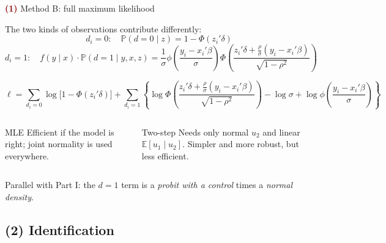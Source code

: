 \documentclass[aspectratio=169,11pt]{beamer}
\newcommand{\E}{\mathbb{E}}
\newcommand{\Pp}{\mathbb{P}}
\newcommand{\Part}[1]{\textcolor{DarkRed}{\textbf{(#1)}}}
\begin{document}
\begin{frame}{\Part{1} Method B: full maximum likelihood}

The two kinds of observations contribute differently:
\[
d_i=0:\quad \Pp(d=0\mid z)=1-\Phi(z_i'\delta)
\]
\[
d_i=1:\quad f(y\mid x)\cdot\Pp(d=1\mid y,x,z)
=\frac1\sigma\phi\!\left(\frac{y_i-x_i'\beta}{\sigma}\right)
\Phi\!\left(\frac{z_i'\delta+\frac{\rho}{\sigma}(y_i-x_i'\beta)}{\sqrt{1-\rho^2}}\right)
\]

\pause

\[
\boxed{
\ell=\sum_{d_i=0}\log\big[1-\Phi(z_i'\delta)\big]
+\sum_{d_i=1}\left\{
\log\Phi\!\left(\frac{z_i'\delta+\frac{\rho}{\sigma}(y_i-x_i'\beta)}{\sqrt{1-\rho^2}}\right)
-\log\sigma+\log\phi\!\left(\frac{y_i-x_i'\beta}{\sigma}\right)
\right\}}
\]

\pause

\begin{columns}[T]
\begin{block}{MLE}
Efficient if the model is right; joint normality is used everywhere.
\end{block}
\begin{block}{Two-step}
Needs only normal $u_2$ and linear $\E[u_1\mid u_2]$. Simpler and more
robust, but less efficient.
\end{block}
\end{columns}

\vspace{0.3em}

Parallel with Part I: the $d=1$ term is a \emph{probit with a
control} times a \emph{normal density}.

\end{frame}

\subsection{(2) Identification}
\end{document}
